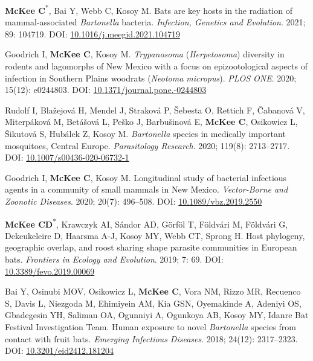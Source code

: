 \documentclass{cv}
\begin{document}
\begin{pubenum}
\item \textbf{McKee C}\textsuperscript{*}, Bai Y, Webb C, Kosoy M. Bats are key hosts in the radiation of mammal-associated \textit{Bartonella} bacteria. \textit{Infection, Genetics and Evolution}. 2021; 89: 104719. DOI: \href{https://doi.org/10.1016/j.meegid.2021.104719}{10.1016/j.meegid.2021.104719}

\item Goodrich I, \textbf{McKee C}, Kosoy M. \textit{Trypanosoma} (\textit{Herpetosoma}) diversity in rodents and lagomorphs of New Mexico with a focus on epizootological aspects of infection in Southern Plains woodrats (\textit{Neotoma micropus}). \textit{PLOS ONE}. 2020; 15(12): e0244803. DOI: \href{https://doi.org/10.1371/journal.pone.0244803}{10.1371/journal.pone.-0244803}

\item Rudolf I, Blažejová H, Mendel J, Straková P, Šebesta O, Rettich F, Čabanová V, Miterpáková M, Betášová L, Peško J, Barbušinová E, \textbf{McKee C}, Osikowicz L, Šikutová S, Hubálek Z, Kosoy M. \textit{Bartonella} species in medically important mosquitoes, Central Europe. \textit{Parasitology Research}. 2020; 119(8): 2713--2717. DOI: \href{https://doi.org/10.1007/s00436-020-06732-1}{10.1007/s00436-020-06732-1}

\item Goodrich I, \textbf{McKee C}, Kosoy M. Longitudinal study of bacterial infectious agents in a community of small mammals in New Mexico. \textit{Vector-Borne and Zoonotic Diseases}. 2020; 20(7): 496--508. DOI: \href{https://doi.org/10.1089/vbz.2019.2550}{10.1089/vbz.2019.2550}

\item \textbf{McKee CD}\textsuperscript{*}, Krawczyk AI, Sándor AD, Görföl T, Földvári M, Földvári G, Dekeukeleire D, Haarsma A-J, Kosoy MY, Webb CT, Sprong H. Host phylogeny, geographic overlap, and roost sharing shape parasite communities in European bats. \textit{Frontiers in Ecology and Evolution}. 2019; 7: 69. DOI: \href{https://doi.org/10.3389/fevo.2019.00069}{10.3389/fevo.2019.00069}

\item Bai Y, Osinubi MOV, Osikowicz L, \textbf{McKee C}, Vora NM, Rizzo MR, Recuenco S, Davis L, Niezgoda M, Ehimiyein AM, Kia GSN, Oyemakinde A, Adeniyi OS, Gbadegesin YH, Saliman OA, Ogunniyi A, Ogunkoya AB, Kosoy MY, Idanre Bat Festival Investigation Team. Human exposure to novel \textit{Bartonella} species from contact with fruit bats. \textit{Emerging Infectious Diseases}. 2018; 24(12): 2317--2323. DOI: \href{https://doi.org/10.3201/eid2412.181204}{10.3201/eid2412.181204}


\end{pubenum}
\end{document}
